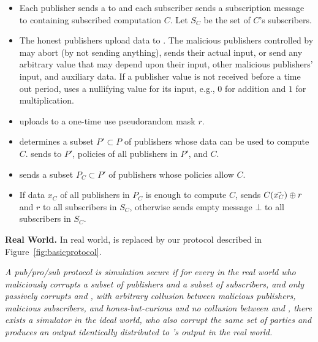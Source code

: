 \begin{itemize}[leftmargin=20pt,itemsep=4pt,topsep=4pt]
		\item Each publisher sends a \policy to \F and each subscriber sends a
			subscription message to \F containing subscribed computation $C$. Let $S_C$
			be the set of $C$'s subscribers. 
			
		
		\item The honest publishers upload data to \F. The malicious publishers
			controlled by \Adv may abort (by not sending anything), sends their
			actual input, or send any arbitrary value that may depend upon their
			input, other malicious publishers' input, and auxiliary data. If a
			publisher value is not received before a time out period, \F uses a
			nullifying value for its input, e.g., $0$ for addition and $1$ for
			multiplication. 
		
		\item \garbler uploads to \F a one-time use pseudorandom mask $r$.

		\item \F determines a subset $P' \subset P$ of publishers whose data can be
			used to compute $C$. \F sends to \broker $P'$, policies of all publishers
			in $P'$, and $C$.

		\item \broker sends \F a subset $P_C \subset P'$ of publishers whose
			policies allow $C$.
			
		\item If data $x_C$ of all publishers in $P_C$ is enough to compute $C$, \F
			sends $C(\vec{x_C}) \oplus r$ and $r$ to all subscribers in $S_C$,
			otherwise \F sends empty message $\bot$ to all subscribers in $S_C$. 

\end{itemize}

\noindent\textbf{Real World.} In real world, \F is replaced by our
protocol described in Figure~\ref{fig:basicprotocol}.

\begin{mdframed}[style=myframe]
\begin{definition}
	\label{def:security}
	\textit{	
	A pub/pro/sub protocol is simulation secure if for every \Adv in the real
	world who maliciously corrupts a subset of publishers and a subset of
	subscribers, and only passively corrupts \broker and \garbler, with arbitrary
	collusion between malicious publishers, malicious subscribers, and
	hones-but-curious \broker and \emph{no} collusion between \broker and
	\garbler, there exists a simulator \Sim in the ideal world, who also corrupt
	the same set of parties and produces an output identically distributed to
	\Adv's output in the real world.}
\end{definition}
\end{mdframed}
